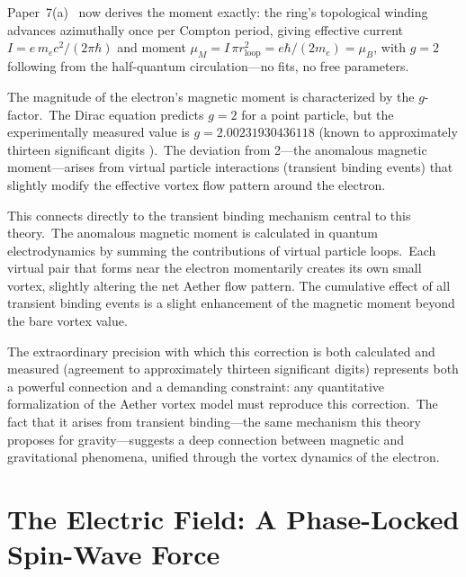 ﻿\documentclass[12pt,letterpaper]{article}
\begin{document}
Paper~7(a)~\cite{otto-boundcore} now derives the moment exactly: the ring's
topological winding advances azimuthally once per Compton period, giving
effective current $I = e\,m_e c^2/(2\pi\hbar)$ and moment
$\mu_M = I\,\pi r_{\mathrm{loop}}^2 = e\hbar/(2m_e) = \mu_B$, with $g = 2$
following from the half-quantum circulation---no fits, no free parameters.

The magnitude of the electron's magnetic moment is characterized by the $g$-factor.\ The
Dirac equation predicts $g = 2$ for a point particle, but the experimentally measured value
is $g = 2.00231930436118$ (known to approximately thirteen significant digits \cite{fan2023}).\ The deviation from
2---the anomalous magnetic moment---arises from virtual particle interactions
(transient binding events) that slightly modify the effective vortex flow pattern around
the electron.

This connects directly to the transient binding mechanism central to this theory.\ The
anomalous magnetic moment is calculated in quantum electrodynamics by summing the
contributions of virtual particle loops.\ Each virtual pair that forms near the electron
momentarily creates its own small vortex, slightly altering the net Aether flow pattern.
The cumulative effect of all transient binding events is a slight enhancement of the
magnetic moment beyond the bare vortex value.

The extraordinary precision with which this correction is both calculated and measured
(agreement to approximately thirteen significant digits) represents both a powerful connection
and a demanding constraint: any quantitative formalization of the Aether vortex model
must reproduce this correction.\ The fact that it arises from transient binding---the
same mechanism this theory proposes for gravity---suggests a deep connection between
magnetic and gravitational phenomena, unified through the vortex dynamics of the electron.


\section{The Electric Field: A Phase-Locked Spin-Wave Force}
\label{sec:electric-field}
\end{document}
